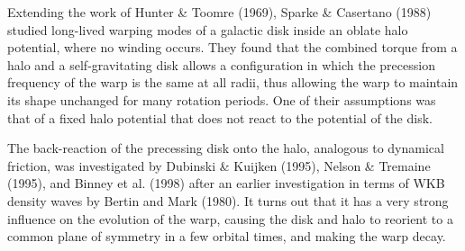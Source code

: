 \documentclass{aa}
\begin{document}
Extending the work of Hunter \& Toomre (1969), Sparke \&
Casertano (1988) studied long-lived warping modes of a
galactic disk inside an oblate halo potential, where 
no winding occurs. They found that the combined torque from a halo and
a self-gravitating disk allows a configuration in which the
precession frequency of the warp is the same at all radii, thus
allowing the warp to maintain its shape unchanged for many rotation 
periods. One of their assumptions was that of a fixed halo
potential that does not react to the potential of the disk. 

The back-reaction of the precessing disk onto the halo, analogous to dynamical
friction, was investigated by Dubinski \& Kuijken (1995), Nelson \&
Tremaine (1995), and Binney et al. (1998) after an earlier investigation
in terms of WKB density waves by Bertin and Mark (1980). It turns out
that it has a very strong influence on the evolution of the warp,
causing the disk and halo to reorient to a common plane of symmetry in
a few orbital times, and making the warp decay. 
\end{document}

